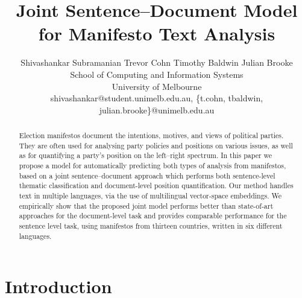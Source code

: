 \documentclass[11pt,a4paper]{article}
\title{Joint Sentence--Document Model for Manifesto Text Analysis}
\author{Shivashankar Subramanian \qquad Trevor Cohn \qquad Timothy Baldwin \qquad Julian Brooke \\School of Computing and Information Systems\\ University of Melbourne \\ shivashankar@student.unimelb.edu.au, \{t.cohn, tbaldwin, julian.brooke\}@unimelb.edu.au}
\date{}
\begin{document}
\maketitle


\begin{abstract}
Election manifestos document the intentions, motives, and views of political parties.
They are often used for analysing party policies and positions on various issues, as well  as for quantifying a party's position on the left--right spectrum. 
In this paper we propose a model for automatically predicting both types of analysis from manifestos, based on a joint sentence--document approach which performs both sentence-level thematic classification and document-level position quantification. 
Our method handles text in multiple languages, via the use of multilingual vector-space embeddings. 
We empirically show that the proposed joint model performs better than state-of-art approaches for the document-level task and provides comparable performance for the sentence level task, using manifestos from thirteen countries, written in six different languages.

\end{abstract}

\section{Introduction}
\end{document}
